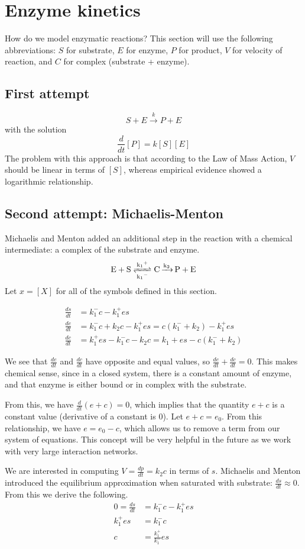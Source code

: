 \documentclass[10pt]{article}
\begin{document}
\section*{Enzyme kinetics}
How do we model enzymatic reactions? This section will use the following abbreviations: $S$ for substrate, $E$ for enzyme, $P$ for product, $V$ for velocity of reaction, and $C$ for complex (substrate + enzyme).

\subsection*{First attempt}
\[ S + E \xrightarrow{k} P + E \] with the solution \[ \frac{d}{dt}[P] = k[S][E] \]
The problem with this approach is that according to the Law of Mass Action, $V$ should be linear in terms of $[S]$, whereas empirical evidence showed a logarithmic relationship.

\subsection*{Second attempt: Michaelis-Menton}
Michaelis and Menton added an additional step in the reaction with a chemical intermediate: a complex of the substrate and enzyme. \[ \ce{E + S <=>[\ce{k_1^{+}}][k_1^{-}] C \xrightarrow{k_2} P + E} \]
Let $x = [X]$ for all of the symbols defined in this section.

\begin{align*}
\frac{ds}{dt} &= k_1^{-}c - k_1^{+}es \\
\frac{de}{dt} &= k_1^{-}c + k_2c - k_1^{+}es = c(k_1^{-} + k_2)-k_1^{+}es \\
\frac{dc}{dt} &= k_1^{+}es - k_1^{-}c - k_2c = k_1{+}es - c(k_1^{-} + k_2)
\end{align*}

We see that $\frac{de}{dt}$ and $\frac{dc}{dt}$ have opposite and equal values, so $\frac{de}{dt} + \frac{dc}{dt} = 0$.
This makes chemical sense, since in a closed system, there is a constant amount of enzyme, and that enzyme is either bound or in complex with the substrate.

From this, we have $\frac{d}{dt}(e+c)=0$, which implies that the quantity $e+c$ is a constant value (derivative of a constant is 0).
Let $e+c=e_0$.
From this relationship, we have $e = e_0 - c$, which allows us to remove a term from our system of equations.
This concept will be very helpful in the future as we work with very large interaction networks.

We are interested in computing $V = \frac{dp}{dt} = k_2c$ in terms of $s$.
Michaelis and Menton introduced the equilibrium approximation when saturated with substrate: $\frac{ds}{dt} \approx 0$. From this we derive the following.
\begin{align*}
0 = \frac{ds}{dt} &= k_1^{-}c - k_1^{+}es \\
        k_1^{+}es &= k_1^{-}c \\
                c &= \frac{k_1^{+}}{k_1^{-}}es
\end{align*}
\end{document}
